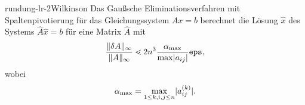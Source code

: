 \begin{Satz*}{rundung-lr-2}{Wilkinson}
  Das Gaußsche Eliminationsverfahren mit Spaltenpivotierung für das
  Gleichungssystem $Ax=b$ berechnet die Lösung $\hat x$ des Systems
  $\hat A \hat x = b$ für eine Matrix $\hat A$ mit
  \begin{gather}
    \frac{\lVert\delta A\rVert_\infty}{\lVert A\rVert_\infty}
    \lessdot 2 n^3 \frac{\alpha_{\max}}{\max \lvert a_{ij}\rvert} \texttt{eps},
  \end{gather}
  wobei
  \begin{gather}
    \alpha_{\max} = \max_{1\le k,i,j\le n} \lvert a^{(k)}_{ij}\rvert.
  \end{gather}
\end{Satz*}




